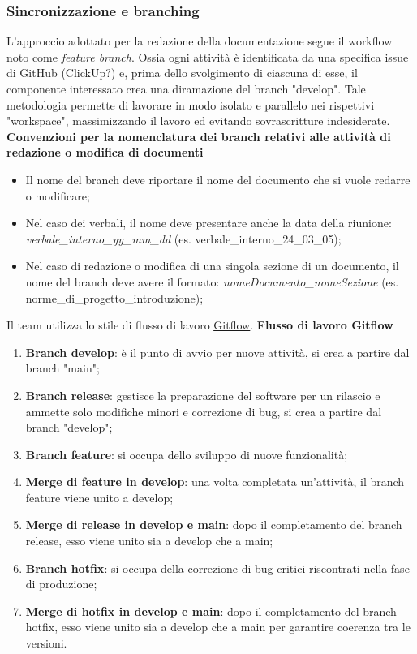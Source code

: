 \subsubsection{Sincronizzazione e branching}

L'approccio adottato per la redazione della documentazione segue il workflow noto come \textit{feature branch}.
Ossia ogni attività è identificata da una specifica issue di GitHub (ClickUp?) e, prima dello svolgimento di
ciascuna di esse, il componente interessato crea una diramazione del branch "develop". Tale metodologia
permette di lavorare in modo isolato e parallelo nei rispettivi "workspace", massimizzando il lavoro ed evitando sovrascritture indesiderate.
\textbf{Convenzioni per la nomenclatura dei branch relativi alle attività di redazione o modifica di documenti} \label{convenzioni_nomenclatura}
\begin{itemize}
	\item Il nome del branch deve riportare il nome del documento che si vuole redarre o modificare;
	\item Nel caso dei verbali, il nome deve presentare anche la data della riunione: \textit{verbale\_interno\_yy\_mm\_dd} (es. verbale\_interno\_24\_03\_05);
	\item Nel caso di redazione o modifica di una singola sezione di un documento, il nome del branch deve avere il formato:
	      \textit{nomeDocumento\_nomeSezione} (es. norme\_di\_progetto\_introduzione);
\end{itemize}

Il team utilizza lo stile di flusso di lavoro \href{https://www.atlassian.com/it/git/tutorials/comparing-workflows/gitflow-workflow}{\underline{{Gitflow}}}.
\textbf{Flusso di lavoro Gitflow}
\begin{enumerate}
	\item \textbf{Branch develop}: è il punto di avvio per nuove attività, si crea a partire dal branch "main";
	\item \textbf{Branch release}: gestisce la preparazione del software per un rilascio e ammette solo
	      modifiche minori e correzione di bug, si crea a partire dal branch "develop";
	\item \textbf{Branch feature}: si occupa dello sviluppo di nuove funzionalità;
	\item \textbf{Merge di feature in develop}: una volta completata un'attività, il branch feature viene
	      unito a develop;
	\item \textbf{Merge di release in develop e main}: dopo il completamento del branch release, esso viene
	      unito sia a develop che a main;
	\item \textbf{Branch hotfix}: si occupa della correzione di bug critici riscontrati nella fase di produzione;
	\item \textbf{Merge di hotfix in develop e main}: dopo il completamento del branch hotfix, esso viene
	      unito sia a develop che a main per garantire coerenza tra le versioni.
\end{enumerate}

